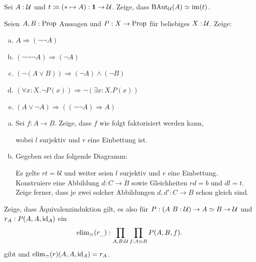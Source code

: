 \documentclass{hott-übung}
\begin{document}
\setcounter{blattnummer}{6}
\setcounter{aufgabennummer}{0}

\blatt

\aufgabe{}
Sei $A:\mathcal{U}$ und $t\vcentcolon\mspace{-1.2mu}\equiv (\ast\mapsto A) : \mathbf{1}\to\mathcal{U}$.
Zeige, dass $\mathrm{BAut}_{\mathcal{U}}(A)\simeq \mathrm{im}(t)$.

\aufgabe{}
Seien $A,B:\mathrm{Prop}$ Aussagen und $P:X\to \mathrm{Prop}$ für beliebiges $X:\mathcal{U}$. Zeige:
\begin{enumerate}[(a)]
\item $A\Rightarrow (\neg\neg A)$
\item $(\neg\neg\neg A) \Rightarrow (\neg A)$
\item $(\neg(A\vee B))\Rightarrow (\neg A) \wedge (\neg B)$
\item $(\forall x:X.\neg P(x))\Rightarrow \neg(\exists x:X.P(x))$
\item $(A\vee \neg A)\Rightarrow ((\neg\neg A) \Rightarrow A)$
\end{enumerate}

\aufgabe{}
  \begin{enumerate}[(a)]
  \item Sei $f:A\to B$. Zeige, dass $f$ wie folgt faktorisiert werden kann,
  \begin{center}
  \end{center}
  wobei $l$ surjektiv und $r$ eine Einbettung ist.
\item Gegeben sei das folgende Diagramm:
  \begin{center}
  \end{center}
  Es gelte $rt=bl$ und weiter seien $l$ surjektiv und $r$ eine Einbettung.
  Konstruiere eine Abbildung \(d : C \to B\) sowie Gleichheiten \(rd=b\) und \(dl = t\).
  Zeige ferner, dass je zwei solcher Abbildungen \(d,d' : C \to B\) schon gleich sind.
\end{enumerate}

  Zeige, dass Äquivalenzinduktion gilt, es also für $P:(A\ B :\mathcal{U})\to A\simeq B\to \mathcal{U}$ und $r_A:P(A,A,\mathrm{id}_A)$ ein
  \[
     \elim_\simeq(r_{\_}):\prod_{A,B:\mU}\prod_{f:A\simeq B}P(A,B,f)\rlap{.}
     \]
     gibt und $\mathrm{elim}_\simeq(r)(A,A,\mathrm{id}_A)=r_A$.
\end{document}
